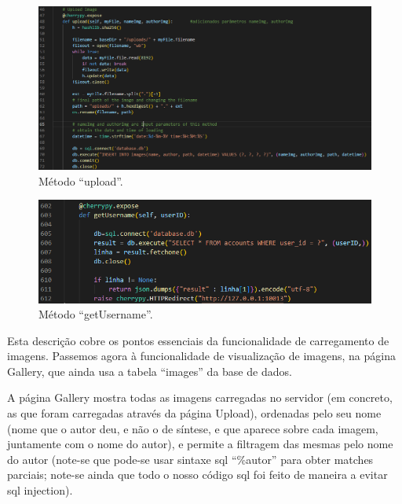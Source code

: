 \documentclass{report}
\begin{document}
\linebreak

\begin{figure}[hbp]

        \includegraphics[scale=0.50]{Images_code/9 - app upload.png}
        \caption{\label{Estrutura}Método “upload”. }
\end{figure}

\begin{figure}[hbp]

        \includegraphics[scale=0.75]{Images_code/9 - app getusername.png}
        \caption{\label{Estrutura}Método “getUsername”. }
\end{figure}

 Esta descrição cobre os pontos essenciais da funcionalidade de carregamento de imagens. Passemos agora à funcionalidade de visualização de imagens, na página Gallery, que ainda usa a tabela “images” da base de dados.

 \newpage
 
    A página Gallery mostra todas as imagens carregadas no servidor (em concreto, as que foram carregadas através da página Upload), ordenadas pelo seu nome (nome que o autor deu, e não o de síntese, e que aparece sobre cada imagem, juntamente com o nome do autor), e permite a filtragem das mesmas pelo nome do autor (note-se que pode-se usar sintaxe sql “\%autor” para obter matches parciais; note-se ainda que todo o nosso código sql foi feito de maneira a evitar sql injection).
\end{document}
